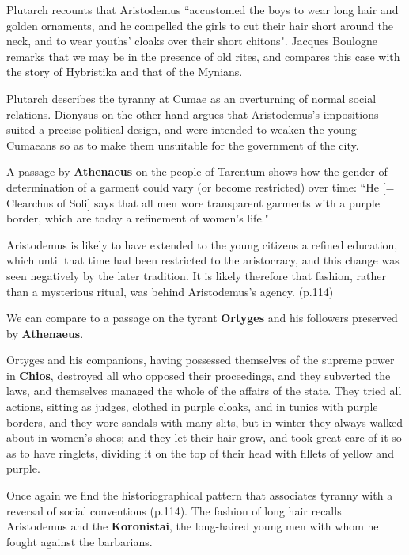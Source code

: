 Plutarch recounts that Aristodemus ``accustomed the boys to wear long hair and golden ornaments, and he compelled the girls to cut their hair short around the neck, and to wear youths' cloaks over their short chitons". Jacques Boulogne remarks that we may be in the presence of old rites, and compares this case with the story of Hybristika and that of the Mynians. 

\begin{nte}
    Plutarch describes the tyranny at Cumae as an overturning of normal social relations. Dionysus on the other hand argues that Aristodemus's impositions suited a precise political design, and were intended to weaken the young Cumaeans so as to make them unsuitable for the government of the city.
\end{nte}

A passage by \textbf{Athenaeus} on the people of Tarentum shows how the gender of determination of a garment could vary (or become restricted) over time: ``He [= Clearchus of Soli] says that all men wore transparent garments with a purple border, which are today a refinement of women's life."


\begin{rmk}
    Aristodemus is likely to have extended to the young citizens a refined education, which until that time had been restricted to the aristocracy, and this change was seen negatively by the later tradition. It is likely therefore that fashion, rather than a mysterious ritual, was behind Aristodemus's agency. (p.114)
\end{rmk}


We can compare to a passage on the tyrant \textbf{Ortyges} and his followers preserved by \textbf{Athenaeus}.

\begin{rmk}
    Ortyges and his companions, having possessed themselves of the supreme power in \textbf{Chios}, destroyed all who opposed their proceedings, and they subverted the laws, and themselves managed the whole of the affairs of the state. They tried all actions, sitting as judges, clothed in purple cloaks, and in tunics with purple borders, and they wore sandals with many slits, but in winter they always walked about in women's shoes; and they let their hair grow, and took great care of it so as to have ringlets, dividing it on the top of their head with fillets of yellow and purple. 
\end{rmk}

Once again we find the historiographical pattern that associates tyranny with a reversal of social conventions (p.114). The fashion of long hair recalls Aristodemus and the \textbf{Koronistai}, the long-haired young men with whom he fought against the barbarians.

